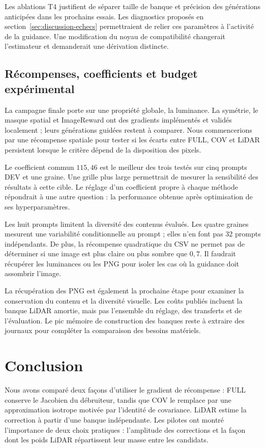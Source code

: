 \documentclass[11pt,a4paper]{article}
\begin{document}
Les ablations T4 justifient de séparer taille de banque et précision des générations anticipées dans les prochains essais. Les diagnostics proposés en section~\ref{sec:discussion-echecs} permettraient de relier ces paramètres à l'activité de la guidance. Une modification du noyau de compatibilité changerait l'estimateur et demanderait une dérivation distincte.

\subsection{Récompenses, coefficients et budget expérimental}
La campagne finale porte sur une propriété globale, la luminance. La symétrie, le masque spatial et ImageReward ont des gradients implémentés et validés localement ; leurs générations guidées restent à comparer. Nous commencerions par une récompense spatiale pour tester si les écarts entre FULL, COV et LiDAR persistent lorsque le critère dépend de la disposition des pixels.

Le coefficient commun $115{,}46$ est le meilleur des trois testés sur cinq prompts DEV et une graine. Une grille plus large permettrait de mesurer la sensibilité des résultats à cette cible. Le réglage d'un coefficient propre à chaque méthode répondrait à une autre question : la performance obtenue après optimisation de ses hyperparamètres.

Les huit prompts limitent la diversité des contenus évalués. Les quatre graines mesurent une variabilité conditionnelle au prompt ; elles n'en font pas 32 prompts indépendants. De plus, la récompense quadratique du CSV ne permet pas de déterminer si une image est plus claire ou plus sombre que $0{,}7$. Il faudrait récupérer les luminances ou les PNG pour isoler les cas où la guidance doit assombrir l'image.

La récupération des PNG est également la prochaine étape pour examiner la conservation du contenu et la diversité visuelle. Les coûts publiés incluent la banque LiDAR amortie, mais pas l'ensemble du réglage, des transferts et de l'évaluation. Le pic mémoire de construction des banques reste à extraire des journaux pour compléter la comparaison des besoins matériels.

\section{Conclusion}
Nous avons comparé deux façons d'utiliser le gradient de récompense : FULL conserve le Jacobien du débruiteur, tandis que COV le remplace par une approximation isotrope motivée par l'identité de covariance. LiDAR estime la correction à partir d'une banque indépendante. Les pilotes ont montré l'importance de deux choix pratiques : l'amplitude des corrections et la façon dont les poids LiDAR répartissent leur masse entre les candidats.
\end{document}
